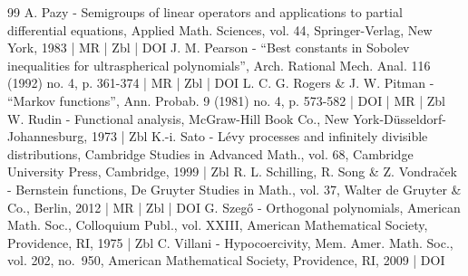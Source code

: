 \begin{thebibliography}{99}
A. Pazy - Semigroups of linear operators and applications to partial differential equations, Applied Math. Sciences, vol. 44, Springer-Verlag, New York, 1983 | MR | Zbl | DOI
J. M. Pearson - “Best constants in Sobolev inequalities for ultraspherical polynomials”, Arch. Rational Mech. Anal. 116 (1992) no. 4, p. 361-374 | MR | Zbl | DOI
L. C. G. Rogers \& J. W. Pitman - “Markov functions”, Ann. Probab. 9 (1981) no. 4, p. 573-582 | DOI | MR | Zbl
W. Rudin - Functional analysis, McGraw-Hill Book Co., New York-Düsseldorf-Johannesburg, 1973 | Zbl
K.-i. Sato - Lévy processes and infinitely divisible distributions, Cambridge Studies in Advanced Math., vol. 68, Cambridge University Press, Cambridge, 1999 | Zbl
R. L. Schilling, R. Song \& Z. Vondraček - Bernstein functions, De Gruyter Studies in Math., vol. 37, Walter de Gruyter \& Co., Berlin, 2012 | MR | Zbl | DOI
G. Szegő - Orthogonal polynomials, American Math. Soc., Colloquium Publ., vol. XXIII, American Mathematical Society, Providence, RI, 1975 | Zbl
C. Villani - Hypocoercivity, Mem. Amer. Math. Soc., vol. 202, no. 950, American Mathematical Society, Providence, RI, 2009 | DOI
\end{thebibliography}

